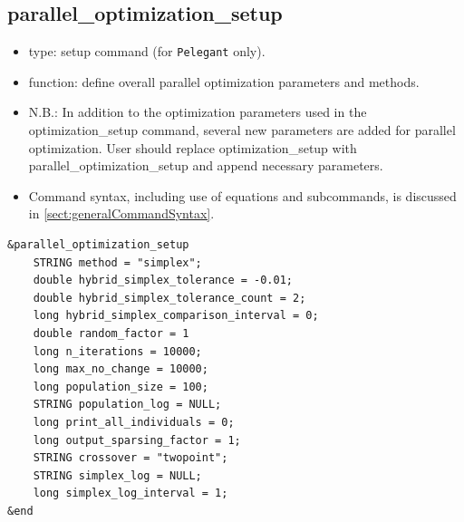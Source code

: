 \documentclass[11pt]{article}
\begin{document}
\subsection{parallel\_optimization\_setup \label{subsec:paralleloptimizationsetup}}

\begin{itemize}
\item type: setup command (for {\tt Pelegant} only).
\item function: define overall parallel optimization parameters and methods.
\item N.B.: In addition to the optimization parameters used in the optimization\_setup command, 	    
      several new parameters are added for parallel optimization. User should replace 
      optimization\_setup with parallel\_optimization\_setup and append necessary parameters. 
\item Command syntax, including use of equations and subcommands, is discussed in \ref{sect:generalCommandSyntax}.
\end{itemize}

\begin{verbatim}
&parallel_optimization_setup
    STRING method = "simplex";
    double hybrid_simplex_tolerance = -0.01;
    double hybrid_simplex_tolerance_count = 2;
    long hybrid_simplex_comparison_interval = 0;
    double random_factor = 1
    long n_iterations = 10000;
    long max_no_change = 10000;
    long population_size = 100;
    STRING population_log = NULL;
    long print_all_individuals = 0;
    long output_sparsing_factor = 1;
    STRING crossover = "twopoint";
    STRING simplex_log = NULL;
    long simplex_log_interval = 1;
&end
\end{verbatim}
\end{document}
